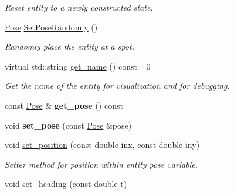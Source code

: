 \begin{DoxyCompactItemize}
\begin{DoxyCompactList}\small\item\em Reset entity to a newly constructed state. \end{DoxyCompactList}\item 
\hyperlink{structPose}{Pose} \hyperlink{classArenaEntity_ad9d597b105a901a79c45cbf704c115d0}{Set\+Pose\+Randomly} ()\hypertarget{classArenaEntity_ad9d597b105a901a79c45cbf704c115d0}{}\label{classArenaEntity_ad9d597b105a901a79c45cbf704c115d0}

\begin{DoxyCompactList}\small\item\em Randomly place the entity at a spot. \end{DoxyCompactList}\item 
virtual std\+::string \hyperlink{classArenaEntity_ad43152003033cf01ad86eeff1990b69a}{get\+\_\+name} () const =0
\begin{DoxyCompactList}\small\item\em Get the name of the entity for visualization and for debugging. \end{DoxyCompactList}\item 
const \hyperlink{structPose}{Pose} \& {\bfseries get\+\_\+pose} () const \hypertarget{classArenaEntity_af3cf4d62c4392bf9b34238693a0f4d9c}{}\label{classArenaEntity_af3cf4d62c4392bf9b34238693a0f4d9c}

\item 
void {\bfseries set\+\_\+pose} (const \hyperlink{structPose}{Pose} \&pose)\hypertarget{classArenaEntity_a6eb76e5f1b5949314c12cc512d6930ae}{}\label{classArenaEntity_a6eb76e5f1b5949314c12cc512d6930ae}

\item 
void \hyperlink{classArenaEntity_a3136704edf07c24639319abf5c28dac0}{set\+\_\+position} (const double inx, const double iny)\hypertarget{classArenaEntity_a3136704edf07c24639319abf5c28dac0}{}\label{classArenaEntity_a3136704edf07c24639319abf5c28dac0}

\begin{DoxyCompactList}\small\item\em Setter method for position within entity pose variable. \end{DoxyCompactList}\item 
void \hyperlink{classArenaEntity_ac1cc3c6997bc7a9573128fc5ded9eb72}{set\+\_\+heading} (const double t)\hypertarget{classArenaEntity_ac1cc3c6997bc7a9573128fc5ded9eb72}{}\label{classArenaEntity_ac1cc3c6997bc7a9573128fc5ded9eb72}


\end{DoxyCompactItemize}
